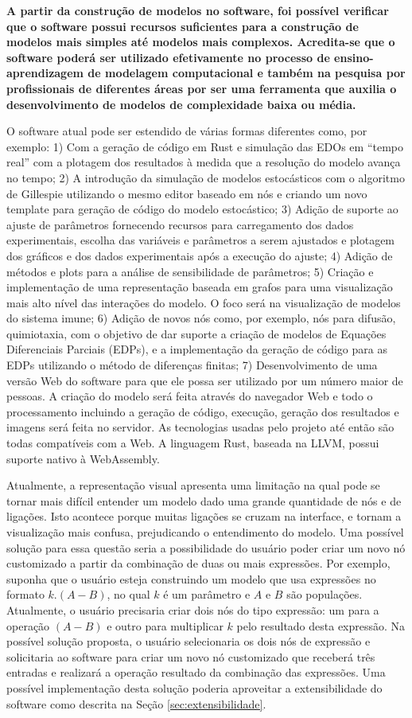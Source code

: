 \documentclass[
	12pt,				%
	openright,			%
	oneside,			%
	a4paper,			%
	main=brazil,
	english,			%
	]{ufsj-abntex2}
\begin{document}
\textbf{A partir da construção de modelos no software, foi possível verificar que o software possui recursos suficientes para a construção de modelos mais simples até modelos mais complexos. Acredita-se que o software poderá ser utilizado efetivamente no processo de ensino-aprendizagem de modelagem computacional e também na pesquisa por profissionais de diferentes áreas por ser uma ferramenta que auxilia o desenvolvimento de modelos de complexidade baixa ou média. }

O software atual pode ser estendido de várias formas diferentes como, por exemplo: 1) Com a geração de código em Rust e simulação das EDOs em ``tempo real'' com a plotagem dos resultados à medida que a resolução do modelo avança no tempo; 2) A introdução da simulação de modelos estocásticos com o algoritmo de Gillespie utilizando o mesmo editor baseado em nós e criando um novo template para geração de código do modelo estocástico; 3) Adição de suporte ao ajuste de parâmetros fornecendo recursos para carregamento dos dados experimentais, escolha das variáveis e parâmetros a serem ajustados e plotagem dos gráficos e dos dados experimentais após a execução do ajuste; 4) Adição de métodos e plots para a análise de sensibilidade de parâmetros; 5) Criação e implementação de uma representação baseada em grafos para uma visualização mais alto nível das interações do modelo. O foco será na visualização de modelos do sistema imune; 6) Adição de novos nós como, por exemplo, nós para difusão, quimiotaxia, com o objetivo de dar suporte a criação de modelos de Equações Diferenciais Parciais (EDPs), e a implementação da geração de código para as EDPs utilizando o método de diferenças finitas; 7) Desenvolvimento de uma versão Web do software para que ele possa ser utilizado por um número maior de pessoas. A criação do modelo será feita através do navegador Web e todo o processamento incluindo a geração de código, execução, geração dos resultados e imagens será feita no servidor. As tecnologias usadas pelo projeto até então são todas compatíveis com a Web. A linguagem Rust, baseada na LLVM, possui suporte nativo à WebAssembly.

Atualmente, a representação visual apresenta uma limitação na qual pode se tornar mais difícil entender um modelo dado uma grande quantidade de nós e de ligações. Isto acontece porque muitas ligações se cruzam na interface, e tornam a visualização mais confusa, prejudicando o entendimento do modelo. Uma possível solução para essa questão seria a possibilidade do usuário poder criar um novo nó customizado a partir da combinação de duas ou mais expressões. Por exemplo, suponha que o usuário esteja construindo um modelo que usa expressões no formato $k.(A - B)$, no qual $k$ é um parâmetro e $A$ e $B$ são populações. Atualmente, o usuário precisaria criar dois nós do tipo expressão: um para a operação $(A - B)$ e outro para multiplicar $k$ pelo resultado desta expressão. Na possível solução proposta, o usuário selecionaria os dois nós de expressão e solicitaria ao software para criar um novo nó customizado que receberá três entradas e realizará a operação resultado da combinação das expressões. Uma possível implementação desta solução poderia aproveitar a extensibilidade do software como descrita na Seção \ref{sec:extensibilidade}.
\end{document}
